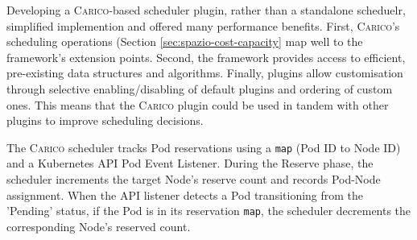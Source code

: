 Developing a \textsc{Carico}-based scheduler plugin, rather than a standalone
scheduelr, simplified implemention and offered many performance benefits. First,
\textsc{Carico}'s scheduling operations (Section \ref{sec:spazio-cost-capacity}
map well to the framework's extension points. Second, the framework provides
access to efficient, pre-existing data structures and algorithms. Finally,
plugins allow customisation through selective enabling/disabling of default
plugins and ordering of custom ones. This means that the \textsc{Carico} plugin
could be used in tandem with other plugins to improve scheduling decisions.

The \textsc{Carico} scheduler tracks Pod reservations using a \verb|map| (Pod ID
to Node ID) and a Kubernetes API Pod Event Listener. During the Reserve phase, the scheduler
increments the target Node's reserve count and records Pod-Node assignment. When
the API listener detects a Pod transitioning from the 'Pending'
status, if the Pod is in its reservation \verb|map|, the scheduler decrements
the corresponding Node's reserved count.
